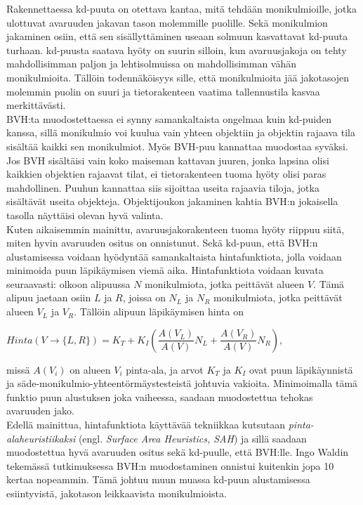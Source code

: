 \documentclass[a4paper, 12pt, titlepage]{article}
\begin{document}
Rakennettaessa kd-puuta on otettava kantaa, mitä tehdään monikulmioille, jotka ulottuvat avaruuden jakavan tason molemmille puolille. Sekä monikulmion jakaminen osiin, että sen sisällyttäminen useaan solmuun kasvattavat kd-puuta turhaan. kd-puusta saatava hyöty on suurin silloin, kun avaruusjakoja on tehty mahdollisimman paljon ja lehtisolmuissa on mahdollisimman vähän monikulmioita. Tällöin todennäköisyys sille, että monikulmioita jää jakotasojen molemmin puolin on suuri ja tietorakenteen vaatima tallennustila kasvaa merkittävästi. \citep[.]{wald04} \\

BVH:ta muodostettaessa ei synny samankaltaista ongelmaa kuin kd-puiden kanssa, sillä monikulmio voi kuulua vain yhteen objektiin ja objektin rajaava tila sisältää kaikki sen monikulmiot. Myös BVH-puu kannattaa muodostaa syväksi. Jos BVH sisältäisi vain koko maiseman kattavan juuren, jonka lapsina olisi kaikkien objektien rajaavat tilat, ei tietorakenteen tuoma hyöty olisi paras mahdollinen. Puuhun kannattaa siis sijoittaa useita rajaavia tiloja, jotka sisältävät useita objekteja. Objektijoukon jakaminen kahtia BVH:n jokaisella tasolla  näyttäisi olevan hyvä valinta. \citep[.]{goldsmith} \\

Kuten aikaisemmin mainittu, avaruusjakorakenteen tuoma hyöty riippuu siitä, miten hyvin avaruuden ositus on onnistunut. Sekä kd-puun, että BVH:n alustamisessa voidaan hyödyntää samankaltaista hintafunktiota, jolla voidaan minimoida puun läpikäymisen viemä aika. Hintafunktiota voidaan kuvata seuraavasti: olkoon alipuussa $N$ monikulmiota, jotka peittävät alueen $V$. Tämä alipuu jaetaan osiin $L$ ja $R$, joissa on $N_L$ ja $N_R$ monikulmiota, jotka peittävät alueen $V_L$ ja $V_R$. Tällöin alipuun läpikäymisen hinta on\\

\begin{centering} 
$Hinta(V\to\{L,R\}) = K_T + K_I(\dfrac{A(V_L)}{A(V)}N_L + \dfrac{A(V_R)}{A(V)}N_R)$,\\
\vspace{0.2cm}
\end{centering}
missä $A(V_i)$ on alueen $V_i$ pinta-ala, ja arvot $K_T$ ja $K_I$ ovat puun läpikäynnistä ja säde-monikulmio-yhteentörmäystesteistä johtuvia vakioita. Minimoimalla tämä funktio puun alustuksen joka vaiheessa, saadaan muodostettua tehokas avaruuden jako. \citep[.]{wald07}\\

Edellä mainittua, hintafunktiota käyttävää tekniikkaa kutsutaan \emph{pinta-alaheuristiikaksi} (engl. \emph{Surface Area Heuristics, SAH}) ja sillä saadaan muodostettua hyvä avaruuden ositus sekä kd-puulle, että BVH:lle. Ingo Waldin tekemässä tutkimuksessa BVH:n muodostaminen onnistui kuitenkin jopa 10 kertaa nopeammin. Tämä johtuu muun muassa kd-puun alustamisessa esiintyvistä, jakotason leikkaavista monikulmioista. \citep[.]{wald07}  
\end{document}
